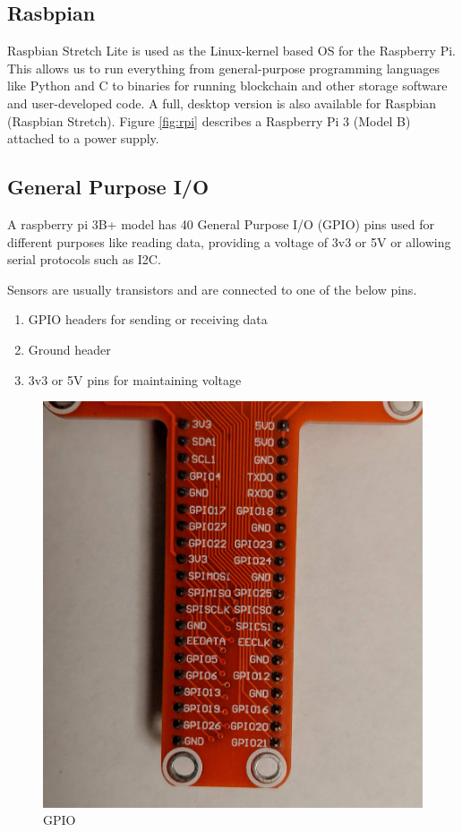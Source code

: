 \documentclass[11pt,openright]{report}
\begin{document}
\newpage
\subsection{Rasbpian}
Raspbian Stretch Lite is used as the Linux-kernel based OS for the Raspberry Pi. This allows us to run everything from general-purpose programming languages like Python and C to binaries for running blockchain and other storage software and user-developed code. A full, desktop version is also available for Raspbian (Raspbian Stretch). Figure \ref{fig:rpi} describes a Raspberry Pi 3 (Model B) attached to a power supply.
 
\subsection{General Purpose I/O}
A raspberry pi 3B+ model has 40 General Purpose I/O (GPIO) pins used for different purposes like reading data, providing a voltage of 3v3 or 5V or allowing serial protocols such as I2C.

Sensors are usually transistors and are connected to one of the below pins.
\begin{enumerate}
\item GPIO headers for sending or receiving data
\item  Ground header 
\item  3v3 or 5V pins for maintaining voltage
\end{enumerate}

\begin{figure}
    \centering
    \includegraphics[scale=0.1]{images/gpiopins.jpg}
    \caption{GPIO}
    \label{fig:gpio_pins}
\end{figure}
\end{document}
